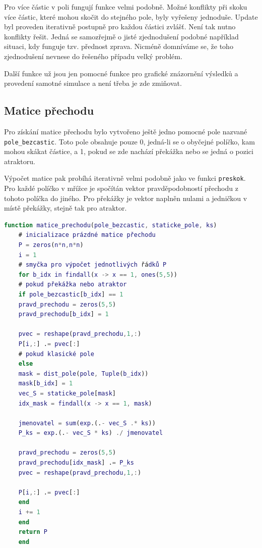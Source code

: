 \documentclass[a4paper, 12pt, fleqn]{article}
\begin{document}
	Pro více částic v poli fungují funkce velmi podobně. Možné konflikty při skoku více částic, které mohou skočit do stejného pole, byly vyřešeny jednoduše. Update byl proveden iterativně postupně pro každou částici zvlášť. Není tak nutno konflikty řešit. Jedná se samozřejmě o jisté zjednodušení podobné například situaci, kdy funguje tzv. přednost zprava. Nicméně domníváme se, že toho zjednodušení nevnese do řešeného případu velký problém.
	
	Další funkce už jsou jen pomocné funkce pro grafické znázornění výsledků a provedení samotné simulace a není třeba je zde zmiňovat.
	
	\subsection{Matice přechodu}
	
	Pro získání matice přechodu bylo vytvořeno ještě jedno pomocné pole nazvané \verb|pole_bezcastic|. Toto pole obsahuje pouze 0, jedná-li se o obyčejné políčko, kam mohou skákat částice, a 1, pokud se zde nachází překážka nebo se jedná o pozici atraktoru.
	
	Výpočet matice pak probíhá iterativně velmi podobně jako ve funkci \verb|preskok|. Pro každé políčko v mřížce je spočítán vektor pravděpodobností přechodu z tohoto políčka do jiného. Pro překážky je vektor naplněn nulami a jedničkou v místě překážky, stejně tak pro atraktor.
	\pagebreak
	\begin{lstlisting}[language=Matlab]
	function matice_prechodu(pole_bezcastic, staticke_pole, ks)
	# inicializace prázdné matice přechodu
	P = zeros(n*n,n*n)
	i = 1
	# smyčka pro výpočet jednotlivých řádků P
	for b_idx in findall(x -> x == 1, ones(5,5))
	# pokud překážka nebo atraktor
	if pole_bezcastic[b_idx] == 1
	pravd_prechodu = zeros(5,5)
	pravd_prechodu[b_idx] = 1
	
	pvec = reshape(pravd_prechodu,1,:)
	P[i,:] .= pvec[:]
	# pokud klasické pole
	else
	mask = dist_pole(pole, Tuple(b_idx))                    
	mask[b_idx] = 1                                         
	vec_S = staticke_pole[mask]                             
	idx_mask = findall(x -> x == 1, mask)                   
	
	jmenovatel = sum(exp.(.- vec_S .* ks))
	P_ks = exp.(.- vec_S * ks) ./ jmenovatel
	
	pravd_prechodu = zeros(5,5)
	pravd_prechodu[idx_mask] .= P_ks
	pvec = reshape(pravd_prechodu,1,:)
	
	P[i,:] .= pvec[:]
	end
	i += 1
	end
	return P
	end
	\end{lstlisting}
	
\end{document}
